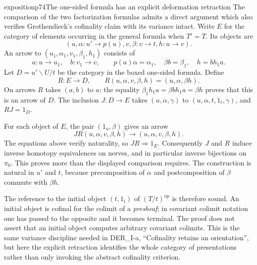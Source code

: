 \begin{dcomment}{exposition}{p74}{The one-sided formula has an explicit deformation retraction}
The comparison of the two factorization formulas admits a direct argument which also verifies Grothendieck's cofinality claim with its variance intact. Write $E$ for the category of elements occurring in the general formula when $T'=T$. Its objects are
\[
 (u,\alpha:u'\to p(u),v,\beta:v\to t,h:u\to v).
\]
An arrow to $(u_1,\alpha_1,v_1,\beta_1,h_1)$ consists of
\[
 a:u\to u_1,\quad b:v_1\to v,\qquad
 p(a)\alpha=\alpha_1,\quad \beta b=\beta_1,\quad
 h=b h_1a.
\]
Let $D=u'\backslash U/t$ be the category in the boxed one-sided formula. Define
\[
 R:E\longrightarrow D,\qquad
 R(u,\alpha,v,\beta,h)=(u,\alpha,\beta h).
\]
On arrows $R$ takes $(a,b)$ to $a$; the equality
$\beta_1h_1a=\beta b h_1a=\beta h$ proves that this is an arrow of $D$. The inclusion $J:D\to E$ takes $(u,\alpha,\gamma)$ to $(u,\alpha,t,1_t,\gamma)$, and $RJ=1_D$.

For each object of $E$, the pair $(1_u,\beta)$ gives an arrow
\[
 JR(u,\alpha,v,\beta,h)
       \longrightarrow(u,\alpha,v,\beta,h).
\]
The equations above verify naturality, so $JR\Rightarrow1_E$. Consequently $J$ and $R$ induce inverse homotopy equivalences on nerves, and in particular inverse bijections on $\pi_0$. This proves more than the displayed comparison requires. The construction is natural in $u'$ and $t$, because precomposition of $\alpha$ and postcomposition of $\beta$ commute with $\beta h$.

The reference to the initial object $(t,1_t)$ of $(T/t)^{\mathrm{op}}$ is therefore sound. An initial object is cofinal for the colimit of a \emph{presheaf}; in covariant colimit notation one has passed to the opposite and it becomes terminal. The proof does not assert that an initial object computes arbitrary covariant colimits. This is the same variance discipline needed in DER\_I-a, ``Cofinality retains an orientation'', but here the explicit retraction identifies the whole category of presentations rather than only invoking the abstract cofinality criterion.
\end{dcomment}

